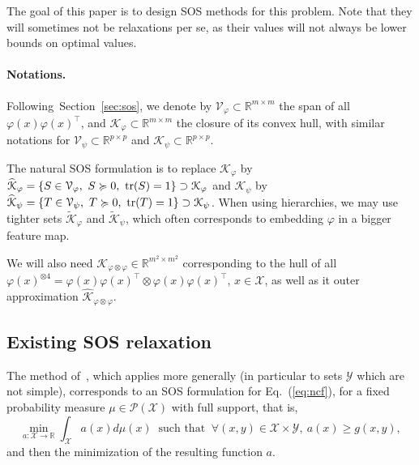 \documentclass[11pt]{article}
\newcommand{\tr}{\mathop{ \rm tr}}
\newcommand{\rb}{\mathbb{R}}
\newcommand{\mysec}[1]{Section~\ref{sec:#1}}
\newcommand{\eq}[1]{Eq.~(\ref{eq:#1})}
\def \X{{\mathcal X}}
\def \V{{\mathcal V}}
\def \Y{{\mathcal Y}}
\def \K{{\mathcal K}}
\begin{document}
The goal of this paper is to design SOS methods for this problem. Note that they will sometimes not be relaxations per se, as their values will not always be lower bounds on optimal values.

\paragraph{Notations.}
Following~\mysec{sos}, we denote by $\V_\varphi \subset \rb^{m \times m}$ the span of all $\varphi(x) \varphi(x)^\top$, and $\K_\varphi  \subset \rb^{m \times m} $ the closure of its convex hull, with similar notations for $\V_\psi  \subset \rb^{p \times p} $ and $\K_\psi  \subset \rb^{p \times p} $.

The natural SOS formulation is to replace $\K_\varphi$ by $\widehat{\K}_\varphi = \{ S \in \V_\varphi, \ S \succcurlyeq 0, \ \tr(S) = 1\} \supset \K_\varphi$ and
$\K_\psi$ by $\widehat{\K}_\psi = \{ T \in \V_\psi, \ T \succcurlyeq 0, \ \tr(T) = 1\} \supset \K_\psi$.
When using hierarchies, we may use tighter sets $\widetilde{\K}_\varphi$ and $\widetilde{\K}_\psi$, which often corresponds to embedding $\varphi$ in a bigger feature map.

We will also need $\mathcal{K}_{\varphi \otimes \varphi} \in \rb^{m^2 \times m^2}$ corresponding to the hull of all $\varphi(x)^{\otimes 4} = 
\varphi(x)\varphi(x)^\top \otimes \varphi(x)\varphi(x)^\top$, $x \in \X$, as well as it outer approximation 
$\widehat{\mathcal{K}}_{\varphi \otimes \varphi}$.

 
 
 \subsection{Existing SOS relaxation} 
 \label{sec:sosex}
 The method of~\cite{lasserre2011min}, which applies more generally (in particular to sets $\Y$ which are not simple), corresponds to an SOS formulation for \eq{ncf}, for a fixed probability measure $\mu \in \mathcal{P}(\X)$ with full support, that is,
\[
 \min_{   a: \X \to \rb} \int_\X a(x) d\mu(x) \ \mbox{ such that } \ \forall (x,y) \in \X \times \Y, \ a(x) \geqslant g(x,y)
 ,
 \]
 and then the minimization of the resulting function $a$.
 
\end{document}
